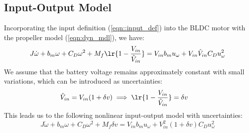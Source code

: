 \subsection{Input-Output Model}
Incorporating the input definition (\ref{eqn::input_def}) into the BLDC motor with the propeller model (\ref{eqn:dyn_mdl}), we have:
\begin{equation}
    J \dot \omega + b_m \omega + C_D \omega^2 + M_f \lr{1 - \frac{V_{in}}{\hat V_{in}}} = V_{in} b_m u_\omega
            + V_{in} \hat V_{in} C_D u_\omega^2
\end{equation}
We assume that the battery voltage remains approximately constant with small variations, which can be introduced as uncertainties:
\begin{align}
    \hat V_{in} &= V_{in} ( 1 + \delta v)
    \implies \lr{1 - \frac{V_{in}}{\hat V_{in}}} = \delta v
\end{align}
This leads us to the following nonlinear input-output model with uncertainties:
\begin{equation}\label{eqn::nl_model}
        J \dot \omega + b_m \omega + C_D \omega^2 + M_f \delta v = V_{in} b_m u_\omega
                + V_{in}^2 (1 + \delta v) C_D u_\omega^2
\end{equation}
